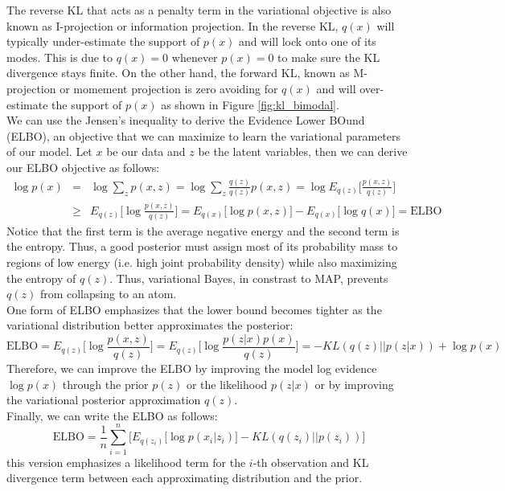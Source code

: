 The reverse KL that acts as a penalty term in the variational objective is also known as I-projection or information projection. In the reverse KL, $q(x)$ will typically under-estimate the support of $p(x)$ and will lock onto one of its modes. This is due to $q(x)=0$ whenever $p(x)=0$ to make sure the KL divergence stays finite. On the other hand, the forward KL, known as M-projection or momement projection is zero avoiding for $q(x)$ and will over-estimate the support of $p(x)$ as shown in Figure \ref{fig:kl_bimodal}.\\

We can use the Jensen's inequality to derive the Evidence Lower BOund (ELBO), an objective that we can maximize to learn the variational parameters of our model. Let $x$ be our data and $z$ be the latent variables, then we can derive our ELBO objective as follows:
\begin{eqnarray}
   \log p(x) &=& \log \sum_{z} p(x,z) = \log \sum_{z}\frac{q(z)}{q(z)} p(x,z) = \log E_{q(z)}\bigg[\frac{p(x,z)}{q(z)} \bigg] \\
   &\geq& E_{q(z)}\bigg[\log \frac{p(x,z)}{q(z)} \bigg] = E_{q(x)}\bigg[\log p(x,z)\bigg] - E_{q(x)}\bigg[\log q(x)\bigg] = \mathrm{ELBO}
\end{eqnarray}
Notice that the first term is the average negative energy and the second term is the entropy. Thus, a good posterior must assign most of its probability mass to regions of low energy (i.e. high joint probability density) while also maximizing the entropy of $q(z)$. Thus, variational Bayes, in constrast to MAP, prevents $q(z)$ from collapsing to an atom.\\  

One form of ELBO emphasizes that the lower bound becomes tighter as the variational distribution better approximates the posterior:
\begin{equation}
    \mathrm{ELBO} = E_{q(z)}\bigg[\log \frac{p(x,z)}{q(z)}\bigg] = E_{q(z)}\bigg[\log \frac{p(z|x)p(x)}{q(z)} \bigg] = -KL(q(z)||p(z|x)) + \log p(x)
\end{equation}
Therefore, we can improve the ELBO by improving the model log evidence $\log p(x)$ through the prior $p(z)$ or the likelihood $p(z|x)$ or by improving the variational posterior approximation $q(z)$.\\

Finally, we can write the ELBO as follows:
\begin{equation}
    \mathrm{ELBO} = \frac{1}{n}\sum_{i=1}^{n}\bigg[E_{q(z_i)}\big[\log p(x_i|z_i)\big] - KL(q(z_i)||p(z_i))\bigg]
\end{equation}
this version emphasizes a likelihood term for the $i$-th observation and KL divergence term between each approximating distribution and the prior.\\

